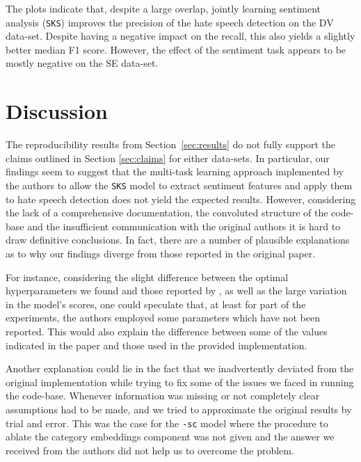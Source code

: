 The plots indicate that, despite a large overlap, jointly learning sentiment analysis (\texttt{SKS}) improves
the precision of the hate speech detection on the DV data-set. Despite having a negative impact on the recall,
this also yields a slightly better median F1 score. However, the effect of the sentiment task appears to be mostly negative on the SE data-set.


\section{Discussion}

The reproducibility results from Section~\ref{sec:results} do not fully support the claims outlined in Section \ref{sec:claims} for either data-sets. In particular, our findings seem to suggest that the multi-task learning approach implemented by the authors to allow the \texttt{SKS} model to extract sentiment features and apply them to hate speech detection does not yield the expected results. However, considering the lack of a comprehensive documentation, the convoluted structure of the code-base and the insufficient communication with the original authors it is hard to draw definitive conclusions. In fact, there are a number of plausible explanations as to why our findings diverge from those reported in the original paper.

For instance, considering the slight difference between the optimal hyperparameters we found and those reported by \cite{original_zhou}, as well as the large variation in the model's scores, one could speculate that, at least for part of the experiments, the authors employed some parameters which have not been reported. This would also explain the difference between some of the values indicated in the paper and those used in the provided implementation.

Another explanation could lie in the fact that we inadvertently deviated from the original implementation while trying to fix some of the issues we faced in running the code-base. Whenever information was missing or not completely clear assumptions had to be made, and we tried to approximate the original results by trial and error. This was the case for the \texttt{-sc} model where the procedure to ablate the category embeddings component was not given and the answer we received from the authors did not help us to overcome the problem.

